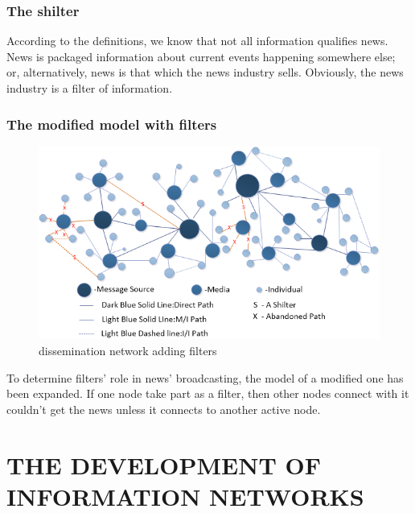 \par 
\subsubsection*{The shilter}
\par 
According to the definitions, we know that not all information qualifies news. News is packaged information about current events happening somewhere else; or, alternatively, news is that which the news industry sells. Obviously, the news industry is a filter of information.
\subsubsection*{The modified model with filters}\begin{figure}[h]
	\small
	\centering
	\includegraphics[width=15cm]{./picture/final1.png}
	\caption{dissemination network adding filters} \label{fig:dissemination network adding shilters}
\end{figure}
\par To determine filters' role in news' broadcasting, the model of a modified one has been expanded. If one node take part as a filter, then other nodes connect with it couldn't get the news unless it connects to another active node.




\section{THE DEVELOPMENT OF INFORMATION NETWORKS}


